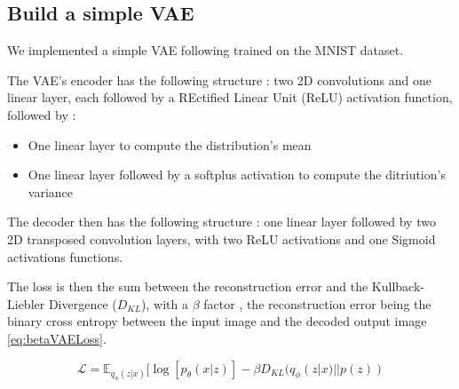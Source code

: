 \subsection{Build a simple VAE}

We implemented a simple VAE following \cite{Kingma2013autoecondingVariationalBayes} trained on the MNIST dataset.

The VAE's encoder has the following structure : two 2D convolutions and one linear layer, each followed by a REctified Linear Unit (ReLU) activation function, followed by :
\begin{itemize}
    \item One linear layer to compute the distribution's mean
    \item One linear layer followed by a softplus activation to compute the ditriution's variance
\end{itemize}

The decoder then has the following structure : 
one linear layer followed by two 2D transposed convolution layers, with two ReLU activations and one Sigmoid activations functions.

The loss is then the sum between the reconstruction error and the Kullback-Liebler Divergence ($D_{KL}$), with a $\beta$ factor \cite{Higgins2017betaVAELB}, the reconstruction error being the binary cross entropy between the input image and the decoded output image \ref{eq:betaVAELoss}.

\begin{equation}\label{eq:betaVAELoss}
    \mathcal{L} = \mathbb{E}_{q_\phi(z|x)}[\log [p_\theta(x|z)] - \beta D_{KL}(q_\phi(z|x)||p(z))
\end{equation}

